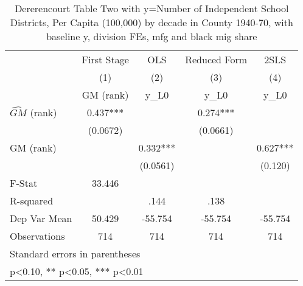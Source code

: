 \begin{table}[htbp]\centering
\def\sym#1{\ifmmode^{#1}\else\(^{#1}\)\fi}
\caption{Dererencourt Table Two with y=Number of Independent School Districts, Per Capita (100,000) by decade in County 1940-70, with baseline y, division FEs, mfg and black mig share}
\begin{tabular}{l*{4}{c}}
\toprule
                    & First Stage   &         OLS   &Reduced Form   &        2SLS   \\
                    &\multicolumn{1}{c}{(1)}&\multicolumn{1}{c}{(2)}&\multicolumn{1}{c}{(3)}&\multicolumn{1}{c}{(4)}\\
                    &\multicolumn{1}{c}{GM  (rank)}&\multicolumn{1}{c}{y\_L0}&\multicolumn{1}{c}{y\_L0}&\multicolumn{1}{c}{y\_L0}\\
\midrule
$\hat{GM}$ (rank)   &       0.437***&               &       0.274***&               \\
                    &    (0.0672)   &               &    (0.0661)   &               \\
\addlinespace
GM  (rank)          &               &       0.332***&               &       0.627***\\
                    &               &    (0.0561)   &               &     (0.120)   \\
\midrule
F-Stat              &      33.446   &               &               &               \\
R-squared           &               &        .144   &        .138   &               \\
Dep Var Mean        &      50.429   &     -55.754   &     -55.754   &     -55.754   \\
Observations        &         714   &         714   &         714   &         714   \\
\bottomrule
\multicolumn{5}{l}{\footnotesize Standard errors in parentheses}\\
\multicolumn{5}{l}{\footnotesize * p<0.10, ** p<0.05, *** p<0.01}\\
\end{tabular}
\end{table}
